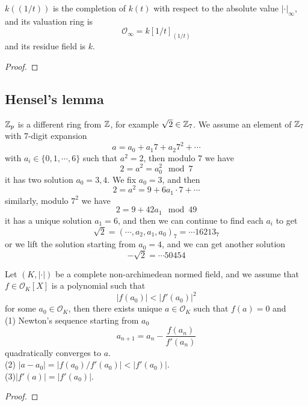 \begin{proposition}
    \(k((1/t))\) is the completion of \(k(t)\) with respect to the absolute value \(|\cdot|_\infty\), and its valuation ring is
    \[\mathcal{O}_\infty = k[1/t]_{(1/t)}\]
    and its residue field is \(k\). 
\end{proposition}

\begin{proof}
    
\end{proof}


\subsection{Hensel's lemma}

\begin{example}
    \(\mathbb{Z}_p\) is a different ring from \(\mathbb{Z}\), for example \(\sqrt{2} \in \mathbb{Z}_7\). We assume an element of \(\mathbb{Z}_7\) with 7-digit expansion
    \[a = a_0 + a_1 7 +a_2 7^2 + \cdots\]
    with \(a_i \in \{0,1,\cdots,6\}\) such that \(a^2 = 2\), then modulo 7 we have
    \[2 = a^2 = a_0^2 \mod 7    \]
    it has two solution \(a_0 = 3,4\). We fix \(a_0 =3 \), and then
    \[2 = a^2 = 9 + 6a_1 \cdot 7 + \cdots\]
    similarly, modulo \(7^2\) we have
    \[2 = 9 +42 a_1 \mod 49\]
    it has a unique solution \(a_1 = 6\), and then we can continue to find each \(a_i\) to get
    \[\sqrt{2} = (\cdots,a_2,a_1,a_0)_7 = \cdots 16213_7\]
    or we lift the solution starting from \(a_0 = 4\), and we can get another solution
    \[-\sqrt{2} = \cdots 50454\]
\end{example}

\begin{theorem} 
    Let \((K,|\cdot|)\) be a complete non-archimedean normed field, and we assume that \(f \in \mathcal{O}_K[X]\) is a polynomial such that 
    \[|f(a_0)| < |f'(a_0)|^2\]
    for some \(a_0 \in \mathcal{O}_K\), then there exists unique \(a \in \mathcal{O}_K\) such that \(f(a ) = 0\) and\\
    (1) Newton's sequence starting from \(a_0\)
    \[a_{n+1} = a_n - \frac{f(a_n)}{f'(a_n)}\]
    quadratically converges to \(a\).\\
    (2) \(|a - a_0|= |f(a_0)/f'(a_0)| < |f'(a_0)|\).\\
    (3)\(|f'(a)| = |f'(a_0)|\).
\end{theorem}

\begin{proof}
    
\end{proof}

